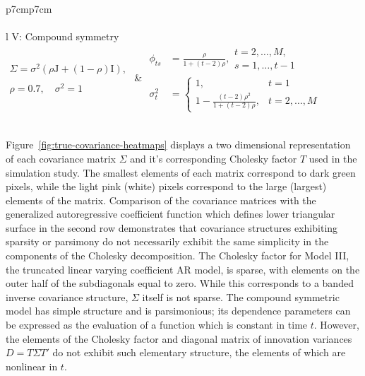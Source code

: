 \begin{table}[H]
\begin{tabular}{p{7cm}p{7cm}}
 \\
\hline
\\
 {l} {V: Compound symmetry} \\[0.3cm]
 $\begin{array}{l}\Sigma = \sigma^2\left(\rho \mathrm{J} + \left(1-\rho\right)\mathrm{I}\right),  \\
 \\
  \rho=0.7, \quad \sigma^2=1 \end{array}$  &  $\begin{aligned}
\phi_{ts} &= \frac{\rho}{1 + \left(t-2\right)\rho}, \begin{array}{l} t = 2, \dots, M,\\ 
				 s = 1, \dots, t-1 \end{array}\\
\sigma_t^2 &= \left\{\begin{array}{ll} 1, & t = 1\\ 1 -\frac{\left(t-2\right)\rho^2}{1 + \left(t-2\right)\rho}, & t = 2, \dots, M \end{array}\right.
\end{aligned}$ \\
 \\
\hline
\end{tabular} \label{table:simulation-model-list}
\end{table}


\bigskip

Figure~\ref{fig:true-covariance-heatmaps} displays a two dimensional representation of each covariance matrix $\Sigma$ and it's corresponding Cholesky factor $T$ used in the simulation study. The smallest elements of each matrix correspond to dark green pixels, while the light pink (white) pixels correspond to the large (largest) elements of the matrix. Comparison of the covariance matrices with the generalized autoregressive coefficient function which defines lower triangular surface in the second row demonstrates that covariance structures exhibiting sparsity or parsimony do not necessarily exhibit the same simplicity in the components of the Cholesky decomposition. The Cholesky factor for Model III, the truncated linear varying coefficient AR model, is sparse, with elements on the outer half of the subdiagonals equal to zero. While this corresponds to a banded inverse covariance structure, $\Sigma$ itself is not sparse.  The compound symmetric model has simple structure and is parsimonious; its dependence parameters can be expressed as the evaluation of a function which is constant in time $t$. However, the elements of the Cholesky factor and diagonal matrix of innovation variances $D = T \Sigma T'$ do not exhibit such elementary structure, the elements of which are nonlinear in $t$. 

